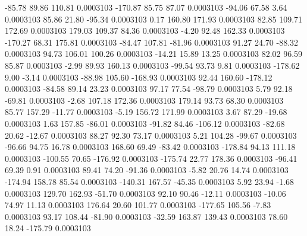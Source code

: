       -85.78       89.86      110.81     0.0003103
     -170.87       85.75       87.07     0.0003103
      -94.06       67.58        3.64     0.0003103
       85.86       21.80      -95.34     0.0003103
        0.17      160.80      171.93     0.0003103
       82.85      109.71      172.69     0.0003103
      179.03      109.37       84.36     0.0003103
       -4.20       92.48      162.33     0.0003103
     -170.27       68.31      175.81     0.0003103
      -84.47      107.81      -81.96     0.0003103
       91.27       24.70      -88.32     0.0003103
       94.73      106.01      100.26     0.0003103
      -14.21       15.89       13.25     0.0003103
       82.02       96.59       85.87     0.0003103
       -2.99       89.93      160.13     0.0003103
      -99.54       93.73        9.81     0.0003103
     -178.62        9.00       -3.14     0.0003103
      -88.98      105.60     -168.93     0.0003103
       92.44      160.60     -178.12     0.0003103
      -84.58       89.14       23.23     0.0003103
       97.17       77.54      -98.79     0.0003103
        5.79       92.18      -69.81     0.0003103
       -2.68      107.18      172.36     0.0003103
      179.14       93.73       68.30     0.0003103
       85.77      157.29      -11.77     0.0003103
       -5.19      156.72      171.99     0.0003103
        3.67       87.29      -19.68     0.0003103
        1.63      157.85      -86.01     0.0003103
      -91.82       84.46     -106.12     0.0003103
      -82.68       20.62      -12.67     0.0003103
       88.27       92.30       73.17     0.0003103
        5.21      104.28      -99.67     0.0003103
      -96.66       94.75       16.78     0.0003103
      168.60       69.49      -83.42     0.0003103
     -178.84       94.13      111.18     0.0003103
     -100.55       70.65     -176.92     0.0003103
     -175.74       22.77      178.36     0.0003103
      -96.41       69.39        0.91     0.0003103
       89.41       74.20      -91.36     0.0003103
       -5.82       20.76       14.74     0.0003103
     -174.94      158.78       85.54     0.0003103
     -140.31      167.57      -45.35     0.0003103
        5.92       23.94       -1.68     0.0003103
      129.70      162.93      -51.70     0.0003103
       92.10       90.46      -12.11     0.0003103
      -10.06       74.97       11.13     0.0003103
      176.64       20.60      101.77     0.0003103
     -177.65      105.56       -7.83     0.0003103
       93.17      108.44      -81.90     0.0003103
      -32.59      163.87      139.43     0.0003103
       78.60       18.24     -175.79     0.0003103
